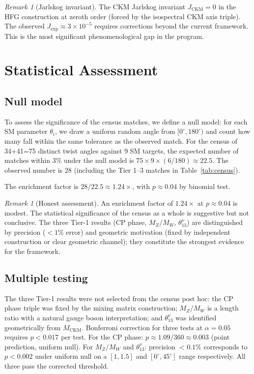 \documentclass[11pt,a4paper]{article}
\theoremstyle{definition}
\theoremstyle{remark}
\newtheorem{remark}[theorem]{Remark}
\newcommand{\MCKM}{M_{\mathrm{CKM}}}
\newcommand{\degr}{^{\circ}}
\begin{document}
\begin{remark}[Jarlskog invariant]
The CKM Jarlskog invariant $J_\mathrm{CKM}=0$ in the HFG construction
at zeroth order (forced by the isospectral CKM axis triple).
The observed $J_\mathrm{exp}\approx3\times10^{-5}$ requires corrections
beyond the current framework.
This is the most significant phenomenological gap in the program.
\end{remark}

\section{Statistical Assessment}
\label{sec:stats}

\subsection{Null model}

To assess the significance of the census matches, we define a null
model: for each SM parameter $\theta_i$, we draw a uniform random angle
from $[0\degr,180\degr)$ and count how many fall within the same
tolerance as the observed match.
For the census of 34+41=75 distinct twist angles against 9 SM targets,
the expected number of matches within $3\%$ under the null model is
$75 \times 9 \times (6/180) \approx 22.5$.
The observed number is $28$ (including the Tier 1--3 matches in
Table~\ref{tab:census}).

The enrichment factor is $28/22.5 \approx 1.24\times$, with
$p\approx 0.04$ by binomial test.

\begin{remark}[Honest assessment]
An enrichment factor of $1.24\times$ at $p\approx0.04$ is modest.
The statistical significance of the census as a whole is suggestive
but not conclusive.
The three Tier-1 results (CP phase, $M_Z/M_W$, $\theta_{13}^\nu$) are
distinguished by precision ($<1\%$ error) and geometric motivation
(fixed by independent construction or clear geometric channel);
they constitute the strongest evidence for the framework.
\end{remark}

\subsection{Multiple testing}

The three Tier-1 results were not selected from the census post hoc:
the CP phase triple was fixed by the mixing matrix construction;
$M_Z/M_W$ is a length ratio with a natural gauge boson interpretation;
and $\theta_{13}^\nu$ was identified geometrically from $\MCKM$.
Bonferroni correction for three tests at $\alpha=0.05$ requires
$p<0.017$ per test.
For the CP phase: $p \approx 1.09/360 \approx 0.003$ (point prediction,
uniform null). For $M_Z/M_W$ and $\theta_{13}^\nu$: precision $<0.1\%$
corresponds to $p < 0.002$ under uniform null on a $[1,1.5]$ and
$[0\degr,45\degr]$ range respectively.
All three pass the corrected threshold.
\end{document}
